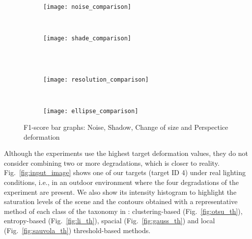 \begin{figure}[!ht]
    \centering
    \begin{subfigure}[b]{0.4\textwidth}
        \texttt{[image: noise\_comparison]}
        \caption{}
        \label{fig:noise_graph}
    \end{subfigure}
        ~ %
    \begin{subfigure}[b]{0.4\textwidth}
        \texttt{[image: shade\_comparison]}
        \caption{}
        \label{fig:shadow_graph}
    \end{subfigure}\\
        ~ %
    \begin{subfigure}[b]{0.4\textwidth}
        \texttt{[image: resolution\_comparison]}
        \caption{}
        \label{fig:resolution_graph}
    \end{subfigure}
        ~ %
    \begin{subfigure}[b]{0.4\textwidth}
        \texttt{[image: ellipse\_comparison]}
        \caption{}
        \label{fig:deformation_graph}
    \end{subfigure}
    \caption{F1-score bar graphs:  Noise,  Shadow,  Change of size and  Perspectice deformation}\label{fig:degradations_graphs}
\end{figure}

Although the experiments use the highest target deformation values, they do not consider combining two or more degradations, which is closer to reality. Fig.\ \ref{fig:input_image} shows one of our targets (target ID 4) under real lighting conditions, i.e., in an outdoor environment where the four degradations of the experiment are present. We also show its intensity histogram to highlight the saturation levels of the scene and the contours obtained with a representative method of each class of the taxonomy in \citep{Sezgin.Sankur:EI:2010}: clustering-based (Fig.\ \ref{fig:otsu_th}), entropy-based (Fig.\ \ref{fig:li_th}), spacial (Fig.\ \ref{fig:gauss_th}) and local (Fig.\ \ref{fig:sauvola_th}) threshold-based methods. 

